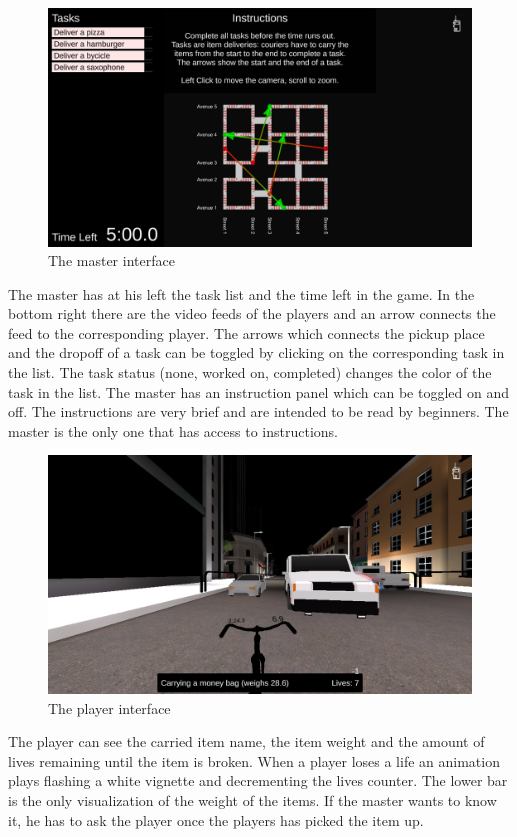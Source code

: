 \documentclass[12pt]{article}
\begin{document}
\begin{figure}[H]
\includegraphics[width=\textwidth]{master}
\caption{The master interface}
\end{figure}
The master has at his left the task list and the time left in the game. In the bottom right there are the video feeds of the players and an arrow connects the feed to the corresponding player. The arrows which connects the pickup place and the dropoff of a task can be toggled by clicking on the corresponding task in the list. The task status (none, worked on, completed) changes the color of the task in the list. The master has an instruction panel which can be toggled on and off. The instructions are very brief and are intended to be read by beginners. The master is the only one that has access to instructions.
\begin{figure}[H]
\includegraphics[width=\textwidth]{gameplay}
\caption{The player interface}
\end{figure}
The player can see the carried item name, the item weight and the amount of lives remaining until the item is broken. When a player loses a life an animation plays flashing a white vignette and decrementing the lives counter. The lower bar is the only visualization of the weight of the items. If the master wants to know it, he has to ask the player once the players has picked the item up. 
\end{document}
